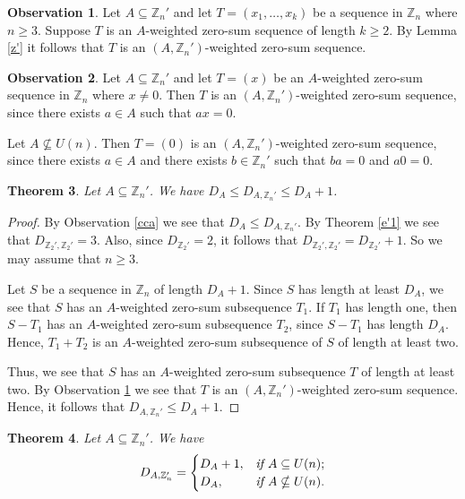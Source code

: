 \documentclass{article}[11pt]
\newtheorem{theorem}{Theorem}[section]
\theoremstyle{definition}
\newtheorem{observation}[theorem]{Observation}
\begin{document}
\begin{observation}\label{1zn}
Let $A\subseteq \mathbb Z_n'$ and let $T=(x_1,\ldots,x_k)$ be a sequence in $\mathbb Z_n$ where $n\geq 3$. Suppose $T$ is an $A$-weighted zero-sum sequence of length $k\geq 2$. By Lemma \ref{z'} it follows that $T$ is an $(A,\mathbb Z_n')$-weighted zero-sum sequence.
\end{observation}

\begin{observation}\label{2zn}
Let $A\subseteq \mathbb Z_n'$ and let $T=(x)$ be an $A$-weighted zero-sum sequence in $\mathbb Z_n$ where $x\neq 0$. Then $T$ is an $(A,\mathbb Z_n')$-weighted zero-sum sequence, since there exists $a\in A$ such that $ax=0$.

Let $A\nsubseteq U(n)$. Then $T=(0)$ is an $(A,\mathbb Z_n')$-weighted zero-sum sequence, since there exists $a\in A$ and there exists $b\in \mathbb Z_n'$ such that $ba=0$ and $a0=0$.
\end{observation}


\begin{theorem}\label{daan}
Let $A\subseteq \mathbb Z_n'$. We have $D_A\leq D_{A,\mathbb Z_n'}\leq D_A+1$.
\end{theorem}

\begin{proof}
By Observation \ref{cca} we see that $D_A\leq D_{A,\mathbb Z_n'}$. By Theorem \ref{e'1} we see that $D_{\mathbb Z_2',\mathbb Z_2'}=3$. Also, since $D_{\mathbb Z_2'}=2$, it follows that $D_{\mathbb Z_2',\mathbb Z_2'}=D_{\mathbb Z_2'}+1$. So we may assume that $n\geq 3$.

Let $S$ be a sequence in $\mathbb Z_n$ of length $D_A+1$. Since $S$ has length at least $D_A$, we see that $S$ has an $A$-weighted zero-sum subsequence $T_1$. If $T_1$ has length one, then $S-T_1$ has an $A$-weighted zero-sum subsequence $T_2$, since $S-T_1$ has length $D_A$. Hence, $T_1+T_2$ is an $A$-weighted zero-sum subsequence of $S$ of length at least two.

Thus, we see that $S$ has an $A$-weighted zero-sum subsequence $T$ of length at least two.
By Observation \ref{1zn} we see that $T$ is an $(A,\mathbb Z_n')$-weighted zero-sum sequence. Hence, it follows that $D_{A,\mathbb Z_n'}\leq D_A+1$.
\end{proof}


\begin{theorem}\label{dan}
Let $A\subseteq \mathbb Z_n'$. We have
\[D_{A,\mathbb Z_n'}=
\begin{cases}
D_A+1, & \emph {if }A\subseteq U(n); \\
D_A, & \emph{if }A\nsubseteq U(n).
\end{cases}\]
\end{theorem}
\end{document}
